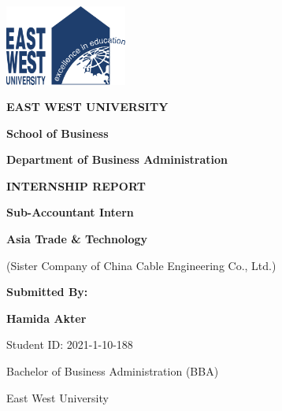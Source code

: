
\begin{titlepage}
    \centering
    
    \vspace*{2cm}
    \includegraphics[width=0.3\textwidth]{assets/images/ewu_logo.png}
    
    \vspace{1cm}
    {\Huge \textbf{EAST WEST UNIVERSITY}}
    
    \vspace{0.5cm}
    {\Large \textbf{School of Business}}
    
    \vspace{0.3cm}
    {\large \textbf{Department of Business Administration}}
    
    \vspace{2cm}
    {\Huge \textbf{INTERNSHIP REPORT}}
    
    \vspace{1cm}
    {\Large \textbf{Sub-Accountant Intern}}
    
    \vspace{0.5cm}
    {\large \textbf{Asia Trade \& Technology}}
    
    \vspace{0.3cm}
    {\large (Sister Company of China Cable Engineering Co., Ltd.)}
    
    \vspace{2cm}
    \begin{minipage}{0.8\textwidth}
        \centering
        {\Large \textbf{Submitted By:}}
        
        \vspace{0.5cm}
        {\Large \textbf{Hamida Akter}}
        
        \vspace{0.3cm}
        {\large Student ID: 2021-1-10-188}
        
        \vspace{0.3cm}
        {\large Bachelor of Business Administration (BBA)}
        
        \vspace{0.3cm}
        {\large East West University}
    \end{minipage}
    

\end{titlepage}
